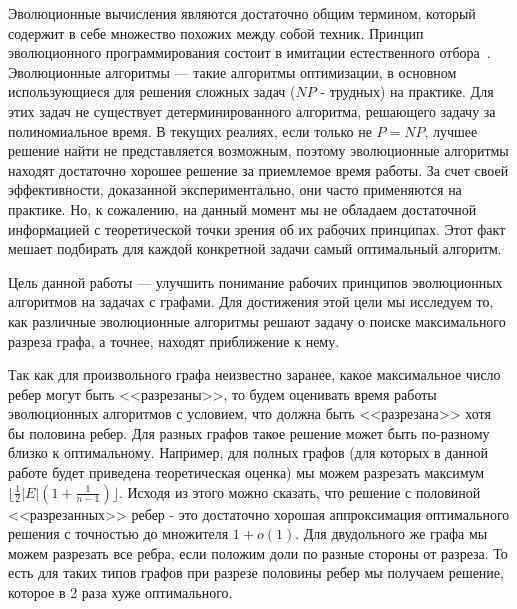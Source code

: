 \documentclass[times]{itmo-student-thesis}
\begin{document}

\tableofcontents

\startprefacepage
Эволюционные вычисления являются достаточно общим термином, который содержит в себе множество похожих между собой техник.
Принцип эволюционного программирования состоит в имитации естественного отбора~\cite{Skobtsov08}.
Эволюционные алгоритмы --- такие алгоритмы оптимизации, в основном использующиеся для решения сложных задач ($NP$ - трудных) на практике.
Для этих задач не существует детерминированного алгоритма, решающего задачу за полиномиальное время.
В текущих реалиях, если только не $P = NP$, лучшее решение найти не представляется возможным, поэтому эволюционные алгоритмы находят достаточно хорошее решение за приемлемое время работы.
За счет своей эффективности, доказанной экспериментально, они часто применяются на практике.
Но, к сожалению, на данный момент мы не обладаем достаточной информацией с теоретической точки зрения об их рабочих принципах.
Этот факт мешает подбирать для каждой конкретной задачи самый оптимальный алгоритм.

Цель данной работы --- улучшить понимание рабочих принципов эволюционных алгоритмов на задачах с графами.
Для достижения этой цели мы исследуем то, как различные эволюционные алгоритмы решают задачу о поиске максимального разреза графа, а точнее, находят приближение к нему.

Так как для произвольного графа неизвестно заранее, какое максимальное число ребер могут быть <<разрезаны>>, то будем оценивать время работы эволюционных алгоритмов с условием, что должна быть <<разрезана>> хотя бы половина ребер.
Для разных графов такое решение может быть по-разному близко к оптимальному.
Например, для полных графов (для которых в данной работе будет приведена теоретическая оценка) мы можем разрезать максимум $\lfloor\frac{1}{2} |E| (1 + \frac{1}{n-1})\rfloor$.
Исходя из этого можно сказать, что решение с половиной <<разрезанных>> ребер - это достаточно хорошая аппроксимация оптимального решения с точностью до множителя $1 + o(1)$.
Для двудольного же графа мы можем разрезать все ребра, если положим доли по разные стороны от разреза.
То есть для таких типов графов при разрезе половины ребер мы получаем решение, которое в 2 раза хуже оптимального.
\end{document}
